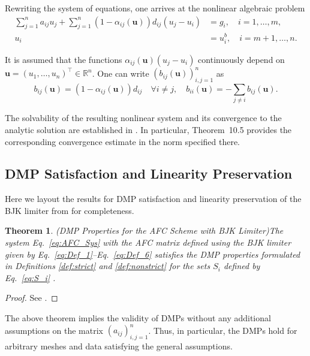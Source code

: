 \documentclass[a4paper]{article}
\theoremstyle{plain}
\newtheorem{theorem}[lemma]{Theorem}
\theoremstyle{definition}
\theoremstyle{remark}
\begin{document}
Rewriting the system of equations, one arrives at the nonlinear algebraic problem
\begin{align*}
	\sum_{j=1}^n a_{ij} u_j + \sum_{j=1}^n (1 - \alpha_{ij}(\mathbf{u})) d_{ij} (u_j - u_i) &= g_i, \quad i = 1, \dots, m,  \\
	u_i &= u_i^b,   \quad i = m + 1, \dots, n. 
\end{align*}

It is assumed that the functions $\alpha_{ij}(\mathbf{u})(u_j - u_i)$ continuously depend on $\mathbf{u} = (u_1, \dots, u_n)^\top \in \mathbb{R}^n$. 
One can write $(b_{ij}(\mathbf{u}))_{i,j=1}^n$ as
\begin{equation}
	b_{ij}(\mathbf{u}) = (1 - \alpha_{ij}(\mathbf{u})) d_{ij} \quad \forall i \neq j, \quad b_{ii}(\mathbf{u}) = -\sum_{j \neq i} b_{ij}(\mathbf{u}).
	\label{eq:AFCMat}
\end{equation}

\vspace{1em}

The solvability of the resulting nonlinear system and its convergence to the
analytic solution are established in \cite[Theorems~10.1 and 10.5]{BJK25}.
In particular, Theorem~10.5 provides the corresponding convergence estimate
in the norm specified there.

\subsection{DMP Satisfaction and Linearity Preservation}
Here we layout the results for DMP satisfaction and linearity preservation of the BJK limiter from \cite{BJK25} for completeness.


\begin{theorem}{(DMP Properties for the AFC Scheme with BJK Limiter)}\label{Thm:DMP_BJK}
	\textit{The system Eq.~\eqref{eq:AFC_Sys} with the AFC matrix defined using the BJK limiter given by Eq.~\eqref{eq:Def_1}--Eq.~\eqref{eq:Def_6} satisfies the DMP properties formulated in Definitions \ref{def:strict} and \ref{def:nonstrict} for the sets $S_i$ defined by Eq.~\eqref{eq:S_i} .}
\end{theorem} 

\begin{proof}
	See \cite[Theorem~10.35]{BJK25}.
\end{proof}

The above theorem implies the validity of DMPs without any additional assumptions on the matrix $(a_{ij})_{i,j=1}^n$. Thus, in particular, the DMPs hold for arbitrary meshes and data satisfying the general assumptions. 
\end{document}
